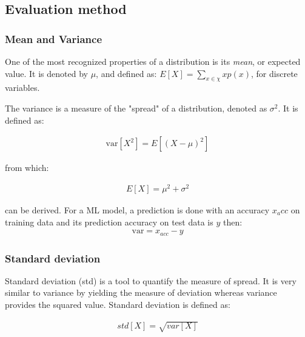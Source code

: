 	

\subsection{Evaluation method}\label{sec:evaluation_method} %


\subsubsection{Mean and Variance}
One of the most recognized properties of a distribution is its \textit{mean}, or expected value. It is denoted by $\mu$, and defined as: $E[X] = \sum_{x \in \chi}x p(x)$, for discrete variables.

The variance is a measure of the "spread" of a distribution, denoted as $\sigma^2$. It is defined as:

\begin{align}
\text{var}[X^2] = E[(X - \mu)^2]
\end{align}

from which:

\begin{align}
E[X] =\mu^2 + \sigma^2
\end{align}

can be derived. For a ML model, a prediction is done with an accuracy $x_acc$ on training data and its prediction accuracy on test data is $y$ then: 
\begin{align}
\text{var} = x_{acc} - y
\end{align}

\subsubsection{Standard deviation}

Standard deviation (\ac{std}) is a tool to quantify the measure of spread. It is very similar to variance by yielding the measure of deviation whereas variance provides the squared value. Standard deviation is defined as:

\begin{align}
std[X] = \sqrt{var[X]}
\end{align}

